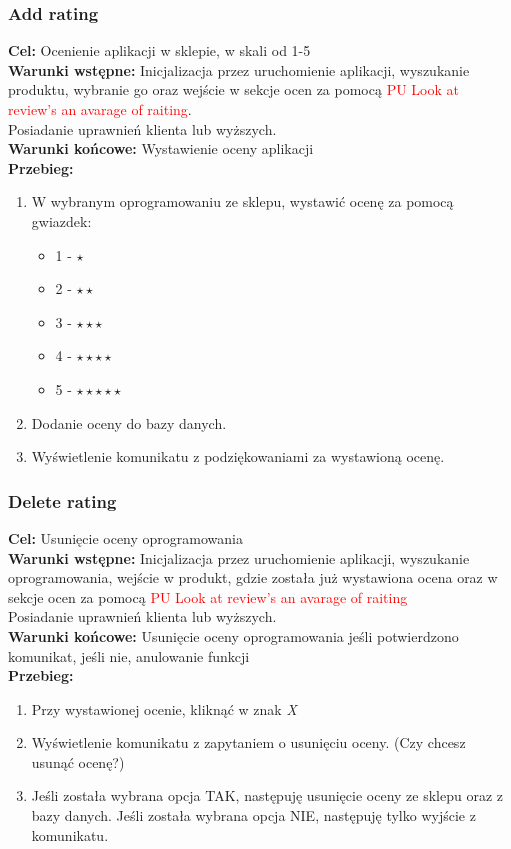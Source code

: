\documentclass[12pt,a4paper]{article}
\begin{document}
\subsubsection{Add rating}
\textbf{Cel: } Ocenienie aplikacji w sklepie, w skali od 1-5  \\
\textbf{Warunki wstępne:} Inicjalizacja przez uruchomienie aplikacji, wyszukanie produktu, wybranie go oraz wejście w sekcje ocen za pomocą \textcolor{red}{PU Look at review's an avarage of raiting}.\\ Posiadanie uprawnień klienta lub wyższych.\\
\textbf{Warunki końcowe: } Wystawienie oceny aplikacji \\
\textbf{Przebieg:}
\begin{enumerate}
    \item W wybranym oprogramowaniu ze sklepu, wystawić ocenę za pomocą gwiazdek:
    \begin{itemize}
        \item 1 - $\star$
        \item 2 - $\star\star$
        \item 3 - $\star\star\star$
        \item 4 - $\star\star\star\star$
        \item 5 - $\star\star\star\star\star$
    \end{itemize}
    \item Dodanie oceny do bazy danych.
    \item Wyświetlenie komunikatu z podziękowaniami za wystawioną ocenę.
\end{enumerate}

\subsubsection{Delete rating}
\textbf{Cel: } Usunięcie oceny oprogramowania  \\
\textbf{Warunki wstępne: }Inicjalizacja przez uruchomienie aplikacji, wyszukanie oprogramowania, wejście w produkt, gdzie została już wystawiona ocena oraz w sekcje ocen za pomocą \textcolor{red}{PU Look at review's an avarage of raiting} \\ Posiadanie uprawnień klienta lub wyższych.\\
\textbf{Warunki końcowe: } Usunięcie oceny oprogramowania jeśli potwierdzono komunikat, jeśli nie, anulowanie funkcji\\
\textbf{Przebieg:}
\begin{enumerate}
    \item Przy wystawionej ocenie, kliknąć w znak \textit{X}
    \item Wyświetlenie komunikatu z zapytaniem o usunięciu oceny. (Czy chcesz usunąć ocenę?)
    \item Jeśli została wybrana opcja TAK, następuję usunięcie oceny ze sklepu oraz z bazy danych. Jeśli została wybrana opcja NIE, następuję tylko wyjście z komunikatu.
\end{enumerate}
\end{document}
